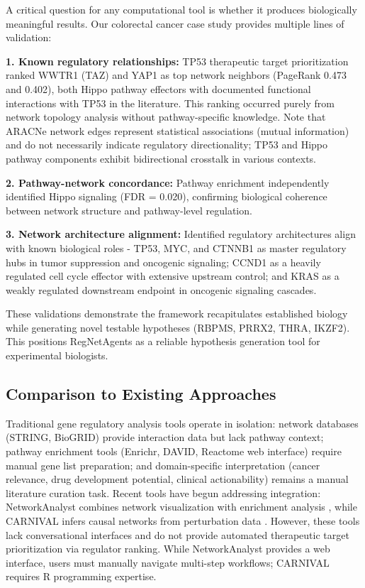 \documentclass[11pt]{article}
\begin{document}
A critical question for any computational tool is whether it produces biologically meaningful results. Our colorectal cancer case study provides multiple lines of validation:

\textbf{1. Known regulatory relationships:} TP53 therapeutic target prioritization ranked WWTR1 (TAZ) and YAP1 as top network neighbors (PageRank 0.473 and 0.402), both Hippo pathway effectors with documented functional interactions with TP53 in the literature. This ranking occurred purely from network topology analysis without pathway-specific knowledge. Note that ARACNe network edges represent statistical associations (mutual information) and do not necessarily indicate regulatory directionality; TP53 and Hippo pathway components exhibit bidirectional crosstalk in various contexts.

\textbf{2. Pathway-network concordance:} Pathway enrichment independently identified Hippo signaling (FDR = 0.020), confirming biological coherence between network structure and pathway-level regulation.

\textbf{3. Network architecture alignment:} Identified regulatory architectures align with known biological roles - TP53, MYC, and CTNNB1 as master regulatory hubs in tumor suppression and oncogenic signaling; CCND1 as a heavily regulated cell cycle effector with extensive upstream control; and KRAS as a weakly regulated downstream endpoint in oncogenic signaling cascades.

These validations demonstrate the framework recapitulates established biology while generating novel testable hypotheses (RBPMS, PRRX2, THRA, IKZF2). This positions RegNetAgents as a reliable hypothesis generation tool for experimental biologists.

\subsection{Comparison to Existing Approaches}

Traditional gene regulatory analysis tools operate in isolation: network databases (STRING, BioGRID) provide interaction data but lack pathway context; pathway enrichment tools (Enrichr, DAVID, Reactome web interface) require manual gene list preparation; and domain-specific interpretation (cancer relevance, drug development potential, clinical actionability) remains a manual literature curation task. Recent tools have begun addressing integration: NetworkAnalyst combines network visualization with enrichment analysis \cite{networkanalyst2019}, while CARNIVAL infers causal networks from perturbation data \cite{carnival2019}. However, these tools lack conversational interfaces and do not provide automated therapeutic target prioritization via regulator ranking. While NetworkAnalyst provides a web interface, users must manually navigate multi-step workflows; CARNIVAL requires R programming expertise.
\end{document}
